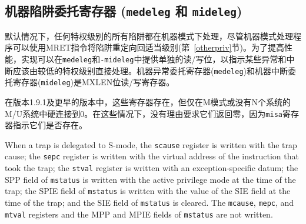 \subsection{机器陷阱委托寄存器 ({\tt medeleg} 和 {\tt mideleg})}

\iffalse
By default, all traps at any privilege level are handled in machine
mode, though a machine-mode handler can redirect traps back to the
appropriate level with the MRET instruction (Section~\ref{otherpriv}).
To increase performance, implementations can provide individual
read/write bits within {\tt medeleg} and {\tt mideleg} to indicate
that certain exceptions and interrupts should be processed directly by
a lower privilege level.  The machine exception delegation register
({\tt medeleg}) and machine interrupt delegation register ({\tt
  mideleg}) are MXLEN-bit read/write registers.

In systems with S-mode, the {\tt medeleg} and {\tt mideleg} registers
must exist, and setting a bit in
{\tt medeleg} or {\tt mideleg} will delegate the corresponding trap, when
occurring in S-mode or U-mode, to the S-mode trap handler.
In systems without S-mode, the {\tt medeleg} and {\tt mideleg} registers
should not exist.
\fi

默认情况下，任何特权级别的所有陷阱都在机器模式下处理，尽管机器模式处理程序可以使用MRET指令将陷阱重定向回适当级别(第~\ref{otherpriv}节)。为了提高性能，实现可以在{\tt medeleg}和{\tt-mideleg}中提供单独的读/写位，以指示某些异常和中断应该由较低的特权级别直接处理。机器异常委托寄存器({\tt medeleg})和机器中断委托寄存器({\tt mideleg})是MXLEN位读/写寄存器。

\iffalse
\begin{commentary}
  In versions 1.9.1 and earlier , these registers existed but were
  hardwired to zero in M-mode only, or M/U without N systems.  There
  is no reason to require they return zero in those cases, as the {\tt
    misa} register indicates whether they exist.
\end{commentary}
\fi

\begin{commentary}
 在版本1.9.1及更早的版本中，这些寄存器存在，但仅在M模式或没有N个系统的M/U系统中硬连接到0。在这些情况下，没有理由要求它们返回零，因为{\tt misa}寄存器指示它们是否存在。
\end{commentary}

\iffalse
When a trap is delegated to S-mode, the
{\tt scause} register is written with the trap cause; the
{\tt sepc} register is written with the virtual address of
the instruction that took the trap; the
{\tt stval} register is written with an
exception-specific datum; the SPP field
of {\tt mstatus} is written with the active privilege mode at the time of
the trap; the SPIE field of {\tt mstatus} is written with the
value of the SIE field at the time of the trap; and
the SIE field of {\tt mstatus} is cleared.
The {\tt mcause}, {\tt mepc}, and {\tt mtval} registers and the MPP and
MPIE fields of {\tt mstatus} are not written.

